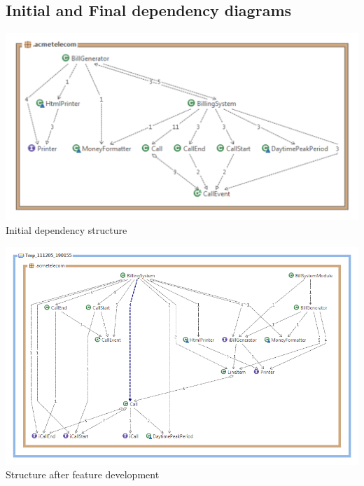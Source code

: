 \documentclass[pdftex,11pt,a4paper]{article}
\begin{document}
\subsection{Initial and Final dependency diagrams}

\begin{center}
	\includegraphics[scale=0.7]{images/Acme_Telecom_Structure.pdf}
Initial dependency structure
\end{center}

\begin{center}
	\includegraphics[scale=0.45]{images/AcmeTelecom_Software_Structure_After_Refactoring.png}\\
Structure after feature development
\end{center}
\end{document}
